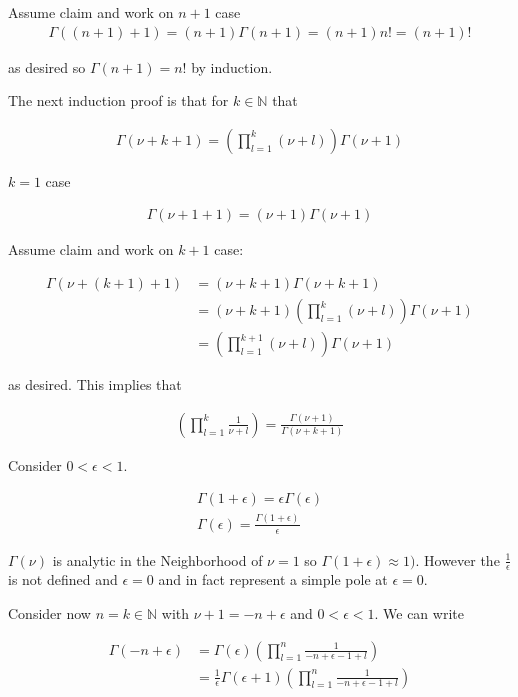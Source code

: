 \documentclass[12pt]{article}
\begin{document}
Assume claim and work on $n+1$ case
\begin{align}
\Gamma((n+1)+1) = (n+1)\Gamma(n+1) = (n+1)n! = (n+1)!
\end{align}

as desired so $\Gamma(n+1) = n!$ by induction.

The next induction proof is that for $k \in \mathbb{N}$ that

\begin{align}
\Gamma(\nu+k+1) = \left(\prod_{l=1}^{k}(\nu+l) \right) \Gamma(\nu+1)
\end{align}

$k=1$ case

\begin{align}
\Gamma(\nu+1+1) = (\nu+1) \Gamma(\nu+1)
\end{align}

Assume claim and work on $k+1$ case:

\begin{align}
\Gamma(\nu+(k+1)+1) &= (\nu+k+1)\Gamma(\nu+k+1)\\
&= (\nu+k+1) \left(\prod_{l=1}^k (\nu+l)\right)\Gamma(\nu+1)\\
&= \left(\prod_{l=1}^{k+1} (\nu+l)\right)\Gamma(\nu+1)
\end{align}

as desired. This implies that

\begin{align}
\left(\prod_{l=1}^{k} \frac{1}{\nu+l}\right) = \frac{\Gamma(\nu+1)}{\Gamma(\nu+k+1)}
\end{align}

Consider $0 < \epsilon < 1$.

\begin{align}
\Gamma(1+\epsilon) = \epsilon \Gamma(\epsilon)\\
\Gamma(\epsilon) = \frac{\Gamma(1+\epsilon)}{\epsilon}
\end{align}

$\Gamma(\nu)$ is analytic in the Neighborhood of $\nu = 1$ so $\Gamma(1+\epsilon) \approx 1)$. However the $\frac{1}{\epsilon}$ is not defined and $\epsilon = 0$ and in fact represent a simple pole at $\epsilon = 0$.

Consider now $n=k \in \mathbb{N}$ with $\nu+1 = -n+\epsilon$ and $0<\epsilon<1$. We can write

\begin{align}
\Gamma(-n + \epsilon) &= \Gamma(\epsilon) \left(\prod_{l=1}^n \frac{1}{-n+\epsilon-1+l}\right)\\
&=  \frac{1}{\epsilon}  \Gamma(\epsilon +1) \left(\prod_{l=1}^n \frac{1}{-n+\epsilon-1+l}\right)\\
\end{align}
\end{document}
